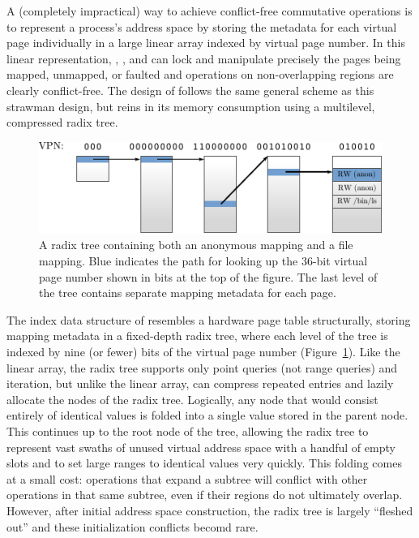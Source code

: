 A (completely impractical) way to achieve conflict-free commutative
operations is to represent a process's address space by storing the
metadata for each
virtual page individually in a large linear array indexed by virtual
page number.  In this linear representation, , ,
and  can lock and manipulate precisely the pages being
mapped, unmapped, or faulted and operations on non-overlapping regions
are clearly conflict-free.  The design of \vm follows the same general
scheme as this strawman design, but reins in its memory consumption
using a multilevel, compressed radix tree.

\begin{figure}
\centering
\includegraphics{figures/radix.pdf}
\caption{A radix tree containing both an anonymous mapping
  and a file mapping.  Blue indicates the path for looking up the 36-bit
  virtual page number shown in bits at the top of the figure.  The last
  level of the tree contains separate mapping metadata for each page.
}
\label{fig:radix}
\end{figure}

The index data structure of \vm resembles a hardware page table
structurally, storing mapping metadata in a fixed-depth radix tree,
where each level of the tree is indexed by nine (or fewer) bits of the
virtual page number (Figure~\ref{fig:radix}).  Like the linear array,
the radix tree supports only point queries (not range queries) and
iteration, but unlike the linear array, \vm can compress repeated
entries and lazily allocate the nodes of the radix tree.  Logically,
any node that would consist entirely of identical values is folded
into a single value stored in the parent node.  This continues up to
the root node of the tree, allowing the radix tree to represent vast
swaths of unused virtual address space with a handful of empty slots
and to set large ranges to identical values very quickly.  This
folding comes at a small cost: operations that expand a subtree will
conflict with other operations in that same subtree, even if their
regions do not ultimately overlap.  However, after initial address
space construction, the radix tree is largely ``fleshed out'' and
these initialization conflicts becomd rare.

